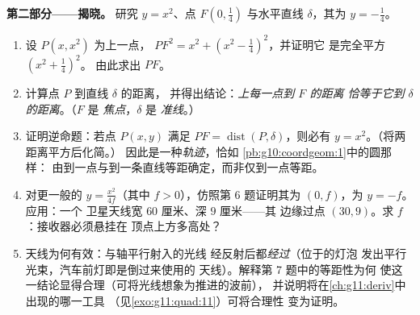 \begin{problem}
\medskip
\noindent\textbf{第二部分——揭晓。}
研究 $y = x^2$、点
$F\left(0, \frac14\right)$ 与水平直线 $\delta$，其为
$y = -\frac14$。
\begin{enumerate}[resume]
  \item 设 $P(x, x^2)$ 为上一点，
        $PF^2 = x^2 + \left(x^2 - \frac14\right)^2$，并证明它
        是完全平方 $\left(x^2 + \frac14\right)^2$。
        由此求出 $PF$。
  \item 计算点 $P$ 到直线 $\delta$ 的距离，
        并得出结论：\emph{上每一点到 $F$ 的距离
        恰等于它到 $\delta$ 的距离}。（$F$ 是
        \emph{焦点}，$\delta$ 是
        \emph{准线}。）
  \item 证明逆命题：若点 $P(x, y)$ 满足
        $PF = \operatorname{dist}(P, \delta)$，则必有
        $y = x^2$。（将两距离平方后化简。）
        因此是一种\emph{轨迹}，恰如
        \cref{pb:g10:coordgeom:1}中的圆那样：
        由到一点与到一条直线等距确定，而非仅到一点等距。
  \item 对更一般的 $y = \frac{x^2}{4f}$（其中
        $f > 0$），仿照第 6 题证明其为
        $(0, f)$，为 $y = -f$。应用：一个
        卫星天线宽 $60$ 厘米、深 $9$ 厘米——其
        边缘过点 $(30, 9)$。求 $f$：接收器必须悬挂在
        顶点上方多高处？
  \item 天线为何有效：与轴平行射入的光线
        经反射后都\emph{经过}（位于的灯泡
        发出平行光束，汽车前灯即是倒过来使用的
        天线）。解释第 7 题中的等距性为何
        使这一结论显得合理（可将光线想象为推进的波前），
        并说明将在\cref{ch:g11:deriv}中出现的哪一工具
        （见\cref{exo:g11:quad:11}）可将合理性
        变为证明。
\end{enumerate}


\end{problem}
